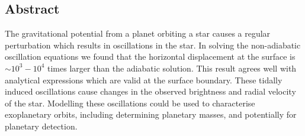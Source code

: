 \documentclass[a0,portrait]{a0poster}
\begin{document}
\vspace{0.0cm} %


\begin{multicols}{2} %


\color{black} %


\begin{tcolorbox}[colframe=black,colback=blue!10!white]

\vspace{0.5cm}

\section*{Abstract}
\large
The gravitational potential from a planet orbiting a star causes a regular perturbation which results in oscillations in the star. In solving the non-adiabatic oscillation equations we found that the horizontal displacement at the surface is $\sim 10^{3} - 10^{4}$ times larger than the adiabatic solution. This result agrees well with analytical expressions which are valid at the surface boundary. These tidally induced oscillations cause changes in the observed brightness and radial velocity of the star. Modelling these oscillations could be used to characterise exoplanetary orbits, including determining planetary masses, and potentially for planetary detection.
\normalsize

\vspace{0.5cm}

\end{tcolorbox}


\color{Black} %

\begin{tcolorbox}[colframe=black,colback=blue!10!white]


\end{tcolorbox}
\end{multicols}
\end{document}
